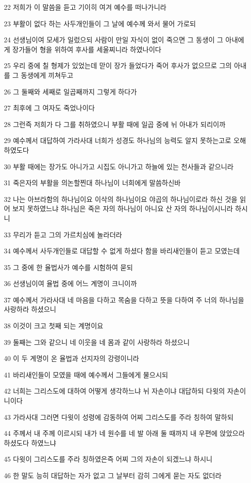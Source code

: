 \par 22 저희가 이 말씀을 듣고 기이히 여겨 예수를 떠나가니라
\par 23 부활이 없다 하는 사두개인들이 그 날에 예수께 와서 물어 가로되
\par 24 선생님이여 모세가 일렀으되 사람이 만일 자식이 없이 죽으면 그 동생이 그 아내에게 장가들어 형을 위하여 후사를 세울찌니라 하였나이다
\par 25 우리 중에 칠 형제가 있었는데 맏이 장가 들었다가 죽어 후사가 없으므로 그의 아내를 그 동생에게 끼쳐두고
\par 26 그 둘째와 세째로 일곱째까지 그렇게 하다가
\par 27 최후에 그 여자도 죽었나이다
\par 28 그런즉 저희가 다 그를 취하였으니 부활 때에 일곱 중에 뉘 아내가 되리이까
\par 29 예수께서 대답하여 가라사대 너희가 성경도 하나님의 능력도 알지 못하는고로 오해하였도다
\par 30 부활 때에는 장가도 아니가고 시집도 아니가고 하늘에 있는 천사들과 같으니라
\par 31 죽은자의 부활을 의논할찐대 하나님이 너희에게 말씀하신바
\par 32 나는 아브라함의 하나님이요 이삭의 하나님이요 야곱의 하나님이로라 하신 것을 읽어 보지 못하였느냐 하나님은 죽은 자의 하나님이 아니요 산 자의 하나님이시니라 하시니
\par 33 무리가 듣고 그의 가르치심에 놀라더라
\par 34 예수께서 사두개인들로 대답할 수 없게 하셨다 함을 바리새인들이 듣고 모였는데
\par 35 그 중에 한 율법사가 예수를 시험하여 묻되
\par 36 선생님이여 율법 중에 어느 계명이 크니이까
\par 37 예수께서 가라사대 네 마음을 다하고 목숨을 다하고 뜻을 다하여 주 너의 하나님을 사랑하라 하셨으니
\par 38 이것이 크고 첫째 되는 계명이요
\par 39 둘째는 그와 같으니 네 이웃을 네 몸과 같이 사랑하라 하셨으니
\par 40 이 두 계명이 온 율법과 선지자의 강령이니라
\par 41 바리새인들이 모였을 때에 예수께서 그들에게 물으시되
\par 42 너희는 그리스도에 대하여 어떻게 생각하느냐 뉘 자손이냐 대답하되 다윗의 자손이니이다
\par 43 가라사대 그러면 다윗이 성령에 감동하여 어찌 그리스도를 주라 칭하여 말하되
\par 44 주께서 내 주께 이르시되 내가 네 원수를 네 발 아래 둘 때까지 내 우편에 앉았으라 하셨도다 하였느냐
\par 45 다윗이 그리스도를 주라 칭하였은즉 어찌 그의 자손이 되겠느냐 하시니
\par 46 한 말도 능히 대답하는 자가 없고 그 날부터 감히 그에게 묻는 자도 없더라

